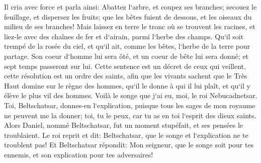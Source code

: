 \verse Il cria avec force et parla ainsi: Abattez l`arbre, et coupez ses branches; secouez le feuillage, et dispersez les fruits; que les bêtes fuient de dessous, et les oiseaux du milieu de ses branches! 
\verse Mais laissez en terre le tronc où se trouvent les racines, et liez-le avec des chaînes de fer et d`airain, parmi l`herbe des champs. Qu`il soit trempé de la rosée du ciel, et qu`il ait, comme les bêtes, l`herbe de la terre pour partage. 
\verse Son coeur d`homme lui sera ôté, et un coeur de bête lui sera donné; et sept temps passeront sur lui. 
\verse Cette sentence est un décret de ceux qui veillent, cette résolution est un ordre des saints, afin que les vivants sachent que le Très Haut domine sur le règne des hommes, qu`il le donne à qui il lui plaît, et qu`il y élève le plus vil des hommes. 
\verse Voilà le songe que j`ai eu, moi, le roi Nebucadnetsar. Toi, Beltschatsar, donnes-en l`explication, puisque tous les sages de mon royaume ne peuvent me la donner; toi, tu le peux, car tu as en toi l`esprit des dieux saints. 
\verse Alors Daniel, nommé Beltschatsar, fut un moment stupéfait, et ses pensées le troublaient. Le roi reprit et dit: Beltschatsar, que le songe et l`explication ne te troublent pas! Et Beltschatsar répondit: Mon seigneur, que le songe soit pour tes ennemis, et son explication pour tes adversaires! 
